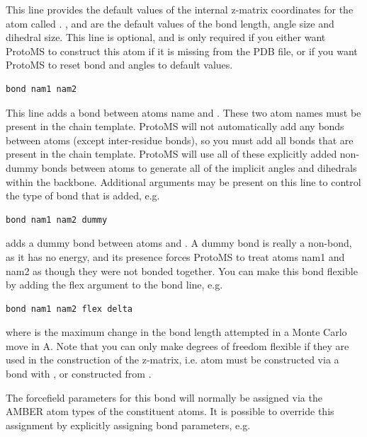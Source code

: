 \documentclass[letterpaper,10pt,english]{sphinxmanual}
\begin{document}
This line provides the default values of the internal z-matrix coordinates for the atom called . ,  and  are the default values of the bond length, angle size and dihedral size. This line is optional, and is only required if you either want ProtoMS to construct this atom if it is missing from the PDB file, or if you want ProtoMS to reset bond and angles to default values.

\begin{Verbatim}[frame=single,commandchars=\\\{\}]
bond nam1 nam2
\end{Verbatim}

This line adds a bond between atoms name  and . These two atom names must be present in the chain template. ProtoMS will not automatically add any bonds between atoms (except inter-residue bonds), so you must add all bonds that are present in the chain template. ProtoMS will use all of these explicitly added non-dummy bonds between atoms to generate all of the implicit angles and dihedrals within the backbone. Additional arguments may be present on this line to control the type of bond that is added, e.g.

\begin{Verbatim}[frame=single,commandchars=\\\{\}]
bond nam1 nam2 dummy
\end{Verbatim}

adds a dummy bond between atoms  and . A dummy bond is really a non-bond, as it has no energy, and its presence forces ProtoMS to treat atoms nam1 and nam2 as though they were not bonded together. You can make this bond flexible by adding the flex argument to the bond line, e.g.

\begin{Verbatim}[frame=single,commandchars=\\\{\}]
bond nam1 nam2 flex delta
\end{Verbatim}

where  is the maximum change in the bond length attempted in a Monte Carlo move in A. Note that you can only make degrees of freedom flexible if they are used in the construction of the z-matrix, i.e. atom  must be constructed via a bond with , or  constructed from .

The forcefield parameters for this bond will normally be assigned via the AMBER atom types of the constituent atoms. It is possible to override this assignment by explicitly assigning bond parameters, e.g.
\end{document}
